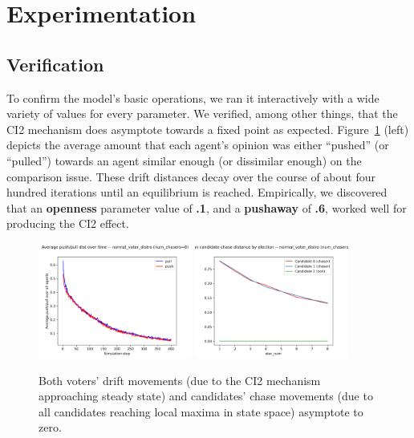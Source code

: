 \section{Experimentation}
\label{sec:experimentation}

\subsection{Verification}

To confirm the model's basic operations, we ran it interactively with a wide
variety of values for every parameter. We verified, among other things, that
the CI2 mechanism does asymptote towards a fixed point as expected.
Figure~\ref{drifts_and_chases_asymptote} (left) depicts the average amount that
each agent's opinion was either ``pushed'' (or ``pulled'') towards an agent
similar enough (or dissimilar enough) on the comparison issue. These drift
distances decay over the course of about four hundred iterations until an
equilibrium is reached. Empirically, we discovered that an \textbf{openness}
parameter value of \textbf{.1}, and a \textbf{pushaway} of \textbf{.6}, worked
well for producing the CI2 effect.

\begin{figure}[ht]
\centering
\includegraphics[width=0.45\textwidth]{assets/drifts_asymptote.png}
\includegraphics[width=0.45\textwidth]{assets/chase_dists_asymptote.png}
\caption{Both voters' drift movements (due to the CI2 mechanism approaching steady
state) and candidates' chase movements (due to all candidates reaching local
maxima in state space) asymptote to zero.}
\label{drifts_and_chases_asymptote}
\end{figure}

